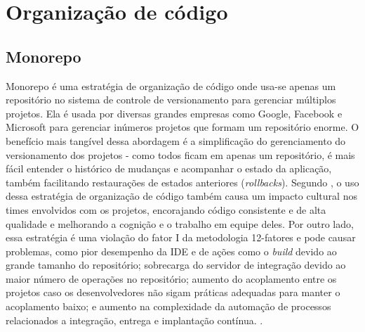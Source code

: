 \section{Organização de código}

\subsection{Monorepo}\label{subsecao-monorepo}
Monorepo é uma estratégia de organização de código onde usa-se apenas um repositório no sistema de controle de versionamento para gerenciar múltiplos projetos. Ela é usada por diversas grandes empresas como Google, Facebook e Microsoft para gerenciar inúmeros projetos que formam um repositório enorme. O benefício mais tangível dessa abordagem é a simplificação do gerenciamento do versionamento dos projetos - como todos ficam em apenas um repositório, é mais fácil entender o histórico de mudanças e acompanhar o estado da aplicação, também facilitando restaurações de estados anteriores (\emph{rollbacks}). Segundo , o uso dessa estratégia de organização de código também causa um impacto cultural nos times envolvidos com os projetos, encorajando código consistente e de alta qualidade e melhorando a cognição e o trabalho em equipe deles. Por outro lado, essa estratégia é uma violação do fator I da metodologia 12-fatores e pode causar problemas, como pior desempenho da IDE e de ações como o \emph{build} devido ao grande tamanho do repositório; sobrecarga do servidor de integração devido ao maior número de operações no repositório; aumento do acoplamento entre os projetos caso os desenvolvedores não sigam práticas adequadas para manter o acoplamento baixo; e aumento na complexidade da automação de processos relacionados a integração, entrega e implantação contínua. \cite{monorepo-polirepo-semaphoreci, monorepo-do-or-do-not, monorepo-polirepo-nicolas}.



